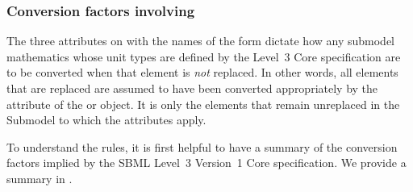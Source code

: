 \subsubsection{Conversion factors involving }

The three attributes on \Submodel with the names of the form
 dictate how any submodel
mathematics whose unit types are defined by the Level~3 Core
specification are to be converted when that element is \emph{not}
replaced.  In other words, all elements that are replaced are assumed 
to have been converted appropriately by the 
attribute of the \ReplacedElement or \ReplacedBy object.  It is only 
the elements that remain unreplaced in the Submodel to which the
 attributes apply.


To understand the rules, it is first helpful to have a summary
of the conversion factors implied by the SBML Level~3 Version~1 Core
specification.  We provide a summary in .

\newcommand{\sprd}[2]{\raisebox{-#1pt}[0pt][(#1pt * 2) + 4pt]{#2}}
\newcommand{\persymb}{\emph{Conversion factor for referenced object}}
\newcommand{\percomp}{\emph{Conversion factor for compartment}}
\newcommand{\allat}{\emph{(All)}}

